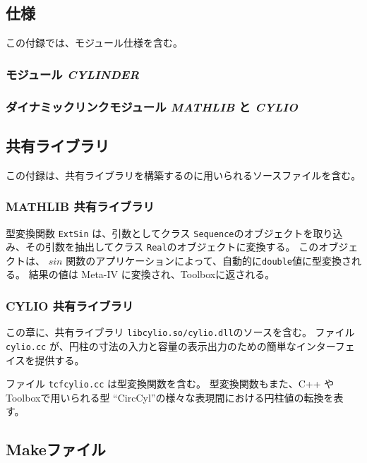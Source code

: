 \documentclass[\pformat,12pt]{jarticle}
\begin{document}
\subsection{仕様}
この付録では、モジュール仕様を含む。
\subsubsection{モジュール \textsl{CYLINDER}}


\subsubsection{ダイナミックリンクモジュール \textsl{MATHLIB} と \textsl{CYLIO}}
\label{sec:math-cylio}





\subsection{共有ライブラリ}
この付録は、共有ライブラリを構築するのに用いられるソースファイルを含む。
\subsubsection{MATHLIB 共有ライブラリ}


型変換関数 {\tt ExtSin} は、引数としてクラス {\tt Sequence}のオブジェクトを取り込み、その引数を抽出してクラス {\tt Real}のオブジェクトに変換する。
このオブジェクトは、 $sin$ 関数のアプリケーションによって、自動的に{\tt double}値に型変換される。
結果の値は Meta-IV に変換され、Toolboxに返される。

\subsubsection{CYLIO 共有ライブラリ}\label{sub:cylio}

この章に、共有ライブラリ {\tt libcylio.so/cylio.dll}のソースを含む。 
ファイル {\tt cylio.cc} が、円柱の寸法の入力と容量の表示出力のための簡単なインターフェイスを提供する。

ファイル {\tt tcfcylio.cc} は型変換関数を含む。
型変換関数もまた、C++ や Toolboxで用いられる型 ``CircCyl''の様々な表現間における円柱値の転換を表す。




  
\subsection{Makeファイル}\label{makefiles}
\end{document}
